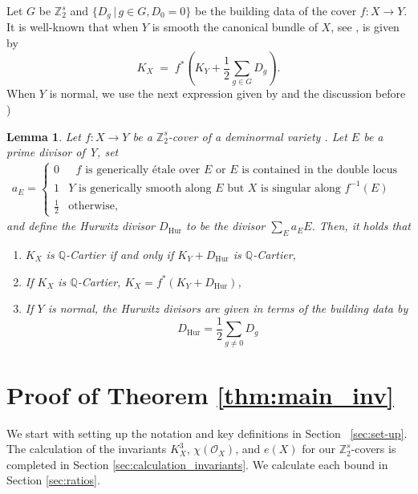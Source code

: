 \documentclass[12pt,twoside,]{amsart}
\theoremstyle{plain}
\newtheorem{lemma}[theorem]{Lemma}
\theoremstyle{definition}
\begin{document}
Let $G$ be  $\mathbb{Z}_2^s$ and 
$\{ D_g \, | \, g \in G, D_0 =0 \}$ be the building data of the cover $f:X \rightarrow Y$. 
It is well-known that when $Y$ is smooth  
the canonical bundle of $X$, see   \cite[Prop 4.2]{pardini1991abelian}, is given by
\begin{equation}
\label{eq:canonical_formula_Z2s}
K_X \;=\; f^*\!\left(K_Y + \frac12\sum_{g\in G} D_g\right).
\end{equation}  
When $Y$ is normal, we use the next expression given by \cite{AP12} and the discussion before \cite[Lemma 2.10]{alexeev2009explicit})
\begin{lemma}
\label{lemma:general_canonical_formula_Z2s}
Let $f : X \to Y$ be a $\mathbb{Z}_2^s$-cover of a deminormal variety . Let $E$ be a prime divisor of Y, set
\begin{align*}
a_E = 
\begin{cases}
0 &
  \text{ 
  $f$ is generically \'etale over $E$ or  $E$ is contained in the double locus
  }
  \\
 1 & 
  \text{
$Y$ is generically smooth along $E$ but $X$ is singular along $f^{-1}(E)$
  }
  \\
   \displaystyle\frac{1}{2} &
  \text{
otherwise,
  }
\end{cases}
\end{align*}
and define the Hurwitz divisor $D_{\operatorname{Hur}}$ to be the divisor $\sum_E a_E E$.
Then, it holds that
\begin{enumerate}
\item[(i)] $K_X$ is $\mathbb{Q}$-Cartier if and only if $K_Y +D_{\operatorname{Hur}}$ is  $\mathbb{Q}$-Cartier, 
\item[(ii)] If $K_X$ is $\mathbb{Q}$-Cartier, 
$K_X =  f^*\left( K_Y + D_{\operatorname{Hur}}\right)
$,  
\item[(iii)] If $Y$ is normal, the Hurwitz divisors are given in terms of the building data by
\[
D_{\mathrm{Hur}}=\frac12\sum_{g\ne 0}D_g 
\]
\end{enumerate}
\end{lemma}







\section{Proof of Theorem \ref{thm:main_inv}}
\label{sec:proof_invariants_theorem}


We start with setting up the notation and key definitions in Section ~\ref{sec:set-up}. The calculation of the invariants 
$K_X^3$, $\chi(\mathcal{O}_X)$, and $e(X)$ for our 
$\mathbb{Z}_2^s$-covers is completed in Section \ref{sec:calculation_invariants}. We calculate each bound in Section \ref{sec:ratios}.
\end{document}
